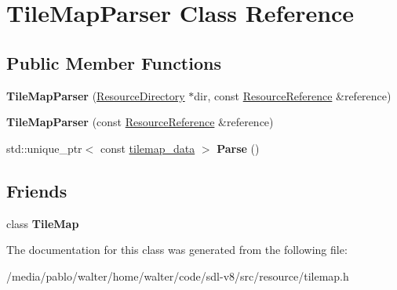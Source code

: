 \hypertarget{classTileMapParser}{}\section{Tile\+Map\+Parser Class Reference}
\label{classTileMapParser}
\subsection*{Public Member Functions}
\begin{DoxyCompactItemize}
\item 
\mbox{\label{classTileMapParser_a843a916670952fb06dbba0c265ca1d9d}} 
{\bfseries Tile\+Map\+Parser} (\mbox{\hyperlink{classResourceDirectory}{Resource\+Directory}} $\ast$dir, const \mbox{\hyperlink{classResourceReference}{Resource\+Reference}} \&reference)
\item 
\mbox{\label{classTileMapParser_a943b4548a41009fe65bd4c791483f6f5}} 
{\bfseries Tile\+Map\+Parser} (const \mbox{\hyperlink{classResourceReference}{Resource\+Reference}} \&reference)
\item 
\mbox{\label{classTileMapParser_aa975b241764c239200dbfb25fcc0d0a6}} 
std\+::unique\+\_\+ptr$<$ const \mbox{\hyperlink{structtilemap__data}{tilemap\+\_\+data}} $>$ {\bfseries Parse} ()
\end{DoxyCompactItemize}
\subsection*{Friends}
\begin{DoxyCompactItemize}
\item 
\mbox{\label{classTileMapParser_acc9955af7e16d78a95cd5ba830c35fe8}} 
class {\bfseries Tile\+Map}
\end{DoxyCompactItemize}


The documentation for this class was generated from the following file\+:\begin{DoxyCompactItemize}
\item 
/media/pablo/walter/home/walter/code/sdl-\/v8/src/resource/tilemap.\+h\end{DoxyCompactItemize}

